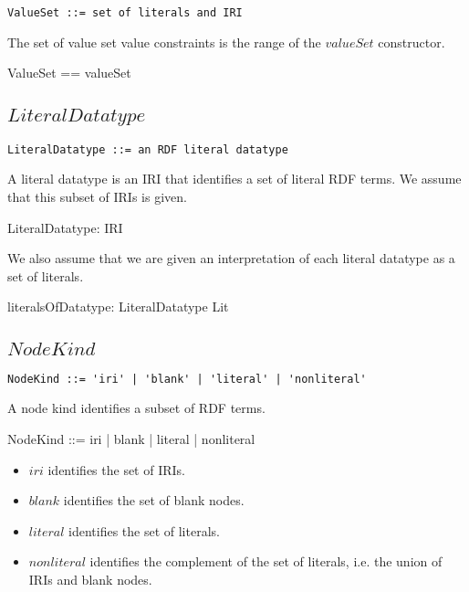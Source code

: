 \documentclass{article}
\begin{document}
\begin{verbatim}
ValueSet ::= set of literals and IRI
\end{verbatim}

The set of value set value constraints is the range of the $valueSet$ constructor.
\begin{zed}
	ValueSet == \ran valueSet
\end{zed}

\subsection{$LiteralDatatype$}

\begin{verbatim}
LiteralDatatype ::= an RDF literal datatype
\end{verbatim}

A literal datatype is an IRI that identifies a set of literal RDF terms.
We assume that this subset of IRIs is given.
\begin{axdef}
	LiteralDatatype: \power IRI
\end{axdef}

We also assume that we are given an interpretation of each literal datatype as a set of literals.
\begin{axdef}
	literalsOfDatatype: LiteralDatatype \fun \power Lit
\end{axdef}

\subsection{$NodeKind$}

\begin{verbatim}
NodeKind ::= 'iri' | 'blank' | 'literal' | 'nonliteral'
\end{verbatim}

A node kind identifies a subset of RDF terms.
\begin{zed}
	NodeKind ::= iri | blank | literal | nonliteral
\end{zed}
\begin{itemize}
\item $iri$ identifies the set of IRIs.
\item $blank$ identifies the set of blank nodes.
\item $literal$ identifies the set of literals.
\item $nonliteral$ identifies the complement of the set of literals, i.e. the union of IRIs and blank nodes.
\end{itemize}
\end{document}
